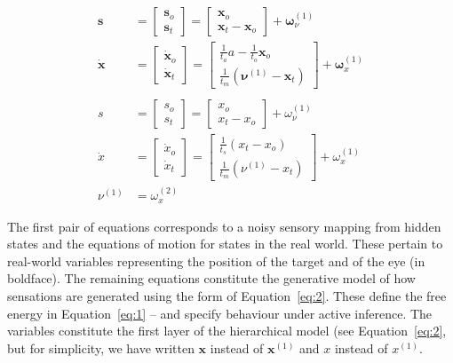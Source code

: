 \documentclass[a4paper]{article} %
\begin{document}
\begin{align}
\bm{s} &=  \left[\begin{array}{c} \bm{s}_o \\ \bm{s}_t \end{array}\right] =  \left[\begin{array}{c} \bm{x}_o \\  \bm{x}_t - \bm{x}_o \end{array}\right] + \bm{\omega}^{(1)}_\nu \nonumber \\%
\bm{\dot{x}} &=  \left[\begin{array}{c} \bm{\dot{x}}_o \\ \bm{\dot{x}}_t \end{array}\right] =  \left[\begin{array}{c} \frac{1}{t_a} a-\frac{1}{t_o}\bm{x}_o \\  \frac{1}{t_m}(\bm{\nu}^{(1)} -  \bm{x}_t) \end{array}\right] + \bm{\omega}^{(1)}_x \nonumber \\%
 \label{eq:8} \\%
s &=  \left[\begin{array}{c} s_o \\ s_t \end{array}\right] =  \left[\begin{array}{c} x_o \\  x_t - x_o \end{array}\right] + \omega^{(1)}_\nu \nonumber \\%
\dot{x} &=  \left[\begin{array}{c} \dot{x}_o \\ \dot{x}_t \end{array}\right] =  \left[\begin{array}{c} \frac{1}{t_s}(x_t-x_o) \\  \frac{1}{t_m}(\nu^{(1)} -  x_t) \end{array}\right] + \omega^{(1)}_x \nonumber \\  %
\nu^{(1)} &= \omega^{(2)}_x \nonumber %
\end{align}%

The first pair of equations corresponds to a noisy sensory mapping from hidden states and the equations of motion for states in the real world. These pertain to real-world variables representing the position of the target and of the eye (in boldface). The remaining equations constitute the generative model of how sensations are generated using the form of Equation~\ref{eq:2}. These define the free energy in Equation~\ref{eq:1} -- and specify behaviour under active inference. The variables constitute the first layer of the hierarchical model (see Equation~\ref{eq:2}, but for simplicity, we have written $\bm{x}$ instead of $\bm{x}^{(1)}$ and ${x}$ instead of ${x}^{(1)}$.
\end{document}
